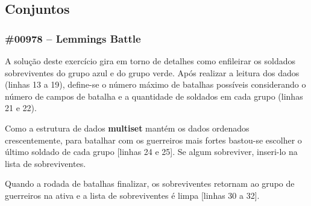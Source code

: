 \documentclass[a4paper,12pt]{scrartcl}
\begin{document}
\subsection{Conjuntos}
\subsubsection{\#00978 – Lemmings Battle}
A solução deste exercício gira em torno de detalhes como enfileirar os soldados sobreviventes do grupo azul e do grupo verde. Após realizar a leitura dos dados (linhas 13 a 19), define-se o número máximo de batalhas possíveis considerando o número de campos de batalha e a quantidade de soldados em cada grupo (linhas 21 e 22).

Como a estrutura de dados \textbf{multiset} mantém os dados ordenados crescentemente, para batalhar com os guerreiros mais fortes bastou-se escolher o último soldado de cada grupo [linhas 24 e 25]. Se algum sobreviver, inseri-lo na lista de sobreviventes.

Quando a rodada de batalhas finalizar, os sobreviventes retornam ao grupo de guerreiros na ativa e a lista de sobreviventes é limpa [linhas 30 a 32].
\end{document}
